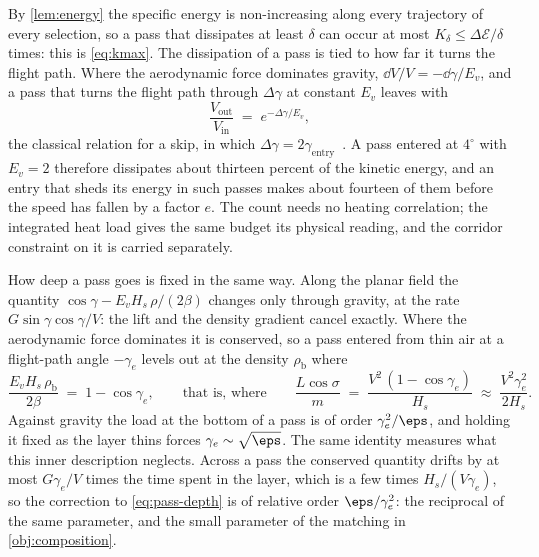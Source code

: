 By \cref{lem:energy} the specific energy is non-increasing along every
trajectory of every selection, so a pass that dissipates at least $\delta$
can occur at most $K_\delta\le\Delta\mathcal{E}/\delta$ times: this is
\cref{eq:kmax}. The dissipation of a pass is tied to how far it turns the
flight path. Where the aerodynamic force dominates gravity,
$\dd V/V = -\dd\gamma/E_v$, and a pass that turns the flight path through
$\Delta\gamma$ at constant $E_v$ leaves with
\begin{equation}\label{eq:turning}
  \frac{V_{\mathrm{out}}}{V_{\mathrm{in}}}
  \;=\; e^{-\Delta\gamma/E_v} ,
\end{equation}
the classical relation for a skip, in which
$\Delta\gamma = 2\gamma_{\mathrm{entry}}$~\cite{eggers1958comparative}. A
pass entered at $4^\circ$ with $E_v = 2$ therefore dissipates about
thirteen percent of the kinetic energy, and an entry that sheds its energy
in such passes makes about fourteen of them before the speed has fallen by
a factor $e$. The count needs no heating correlation; the
integrated heat load gives the same budget its physical reading, and the
corridor constraint on it is carried separately.

How deep a pass goes is fixed in the same way. Along the planar field the
quantity $\cos\gamma - E_v H_s\,\rho/(2\beta)$ changes only through
gravity, at the rate $G\sin\gamma\cos\gamma/V$: the lift and the density
gradient cancel exactly. Where the aerodynamic force dominates it is
conserved, so a pass entered from thin air at a flight-path angle
$-\gamma_e$ levels out at the density $\rho_{\mathrm{b}}$ where
\begin{equation}\label{eq:pass-depth}
  \frac{E_v H_s\,\rho_{\mathrm{b}}}{2\beta} \;=\; 1 - \cos\gamma_e ,
  \qquad\text{that is, where}\qquad
  \frac{L\cos\sigma}{m}
  \;=\; \frac{V^2\,(1-\cos\gamma_e)}{H_s}
  \;\approx\; \frac{V^2\gamma_e^2}{2H_s} .
\end{equation}
Against gravity the load at the bottom of a pass is of order
$\gamma_e^2/\eps$, and holding it fixed as the layer thins forces
$\gamma_e\sim\sqrt{\eps}$. The same identity measures what this inner
description neglects. Across a pass the conserved quantity drifts by at
most $G\gamma_e/V$ times the time spent in the layer, which is a few times
$H_s/(V\gamma_e)$, so the correction to \cref{eq:pass-depth} is of relative
order $\eps/\gamma_e^2$: the reciprocal of the same parameter, and the
small parameter of the matching in \cref{obj:composition}.

